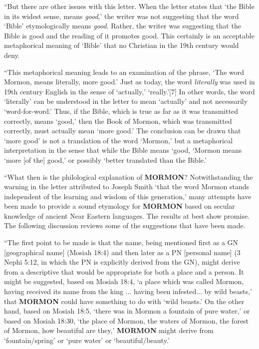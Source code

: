 			``But there are other issues with this letter. When the letter states that `the Bible in its widest sense, means \textit{good},' the writer was not suggesting that the word `Bible' etymologically means \textit{good}. Rather, the writer was suggesting that the Bible is good and the reading of it promotes good. This certainly is an acceptable metaphorical meaning of `Bible' that no Christian in the 19th century would deny.

			``This metaphorical meaning leads to an examination of the phrase, `The word Mormon, means literally, more good.' Just as today, the word \textit{literally} was used in 19th century English in the sense of `actually,' `really.'[7] In other words, the word `literally' can be understood in the letter to mean `actually' and not necessarily `word-for-word.' Thus, if the Bible, which is true as far as it was transmitted correctly, means `good,' then the Book of Mormon, which was transmitted correctly, must actually mean `more good.' The conclusion can be drawn that `more good' is not a translation of the word `Mormon,' but a metaphorical interpretation in the sense that while the Bible means `good, `Mormon means `more [of the] good,' or possibly `better translated than the Bible.'

			``What then is the philological explanation of \textbf{\textsc{MORMON}}? Notwithstanding the warning in the letter attributed to Joseph Smith `that the word Mormon stands independent of the learning and wisdom of this generation,' many attempts have been made to provide a sound etymology for \textbf{\textsc{MORMON}} based on secular knowledge of ancient Near Eastern languages. The results at best show promise. The following discussion reviews some of the suggestions that have been made.

			``The first point to be made is that the name, being mentioned first as a GN [geographical name] (Mosiah 18:4) and then later as a PN [personal name] (3 Nephi 5:12, in which the PN is explicitly derived from the GN), might derive from a descriptive that would be appropriate for both a place and a person. It might be suggested, based on Mosiah 18:4, `a place which was called Mormon, having received its name from the king ... having been infested... by wild beasts,' that \textbf{\textsc{MORMON}} could have something to do with `wild beasts.' On the other hand, based on Mosiah 18:5, `there was in Mormon a fountain of pure water,' or based on Mosiah 18:30, `the place of Mormon, the waters of Mormon, the forest of Mormon, how beautiful are they,' \textbf{\textsc{MORMON}} might derive from `fountain/spring' or `pure water' or `beautiful/beauty.'

